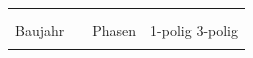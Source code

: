 \documentclass[11pt,a4paper,final,oneside,notitlepage]{report}
\begin{document}
\begin{tabularx}{\textwidth}{|p{}|p{}|p{}|p{}|}
{		} &
		\multicolumn{1}{l|}{
			
		} \\
		\multicolumn{1}{|l}{
			Baujahr
		} &
		\multicolumn{1}{l}{
			\rule{0.275\textwidth}{0.05mm} 
		} &
		\multicolumn{1}{|l}{
			Phasen
		} &
		\multicolumn{1}{l|}{
			\makebox[0pt][l]{$\square$}\raisebox{.15ex}{\hspace{0.1em}}\hspace{0.01\textwidth} 1-polig\hspace{0.04\textwidth} \makebox[0pt][l]{$\square$}\raisebox{.15ex}{\hspace{0.1em}}\hspace{0.01\textwidth} 3-polig
		} \\[1.25ex]
		\hline
	\end{tabularx}

	\vspace{0.01\textwidth}
\end{document}
